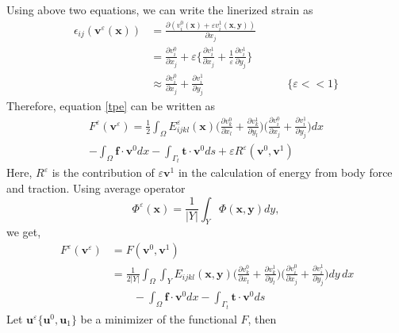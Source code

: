 \documentclass[openright,twoside]{iitkthesis}
\newcommand{\e}[1]{\textbf{#1}}
\begin{document}
Using above two equations, we can write the linerized strain as
\begin{equation}
\begin{split}
\epsilon_{ij}(\textbf{v}^\varepsilon(\textbf{x})) &= \frac{\partial (v_{i}^0(\textbf{x})+\varepsilon v_{i}^1(\textbf{x},\textbf{y}))}{\partial x_j}\\
&=\frac{\partial v_i^0}{\partial x_j}+\varepsilon\bigg\{\frac{\partial v_{i}^1}{\partial x_j}+\frac{1}{\varepsilon}\frac{\partial v_{i}^1}{\partial y_j}\bigg\}\\
&\approx \frac{\partial v_{i}^0}{\partial x_j}+\frac{\partial v_{i}^1}{\partial y_j} &\qquad \{ \varepsilon << 1\}
\end{split}
\end{equation}
Therefore, equation \eqref{tpe} can be written as 
\begin{multline}
F^\varepsilon(\textbf{v}^\varepsilon) = \frac{1}{2}\int_\Omega E^\varepsilon_{ijkl}(\e x)\bigg (\frac{\partial v_{k}^0}{\partial x_l}+\frac{\partial v_{k}^1}{\partial y_l}\bigg )\bigg (\frac{\partial v_{i}^0}{\partial x_j}+\frac{\partial v_{i}^1}{\partial y_j}\bigg )dx\\
-\int_\Omega\textbf{f}\cdot\textbf{v}^0 dx - \int_{\Gamma_t}\textbf{t}\cdot\textbf{v}^0 ds + \varepsilon R^\varepsilon(\textbf{v}^0, \textbf{v}^1)
\end{multline}
Here, $R^\varepsilon$ is the contribution of $\varepsilon\textbf{v}^1$ in the calculation of energy from body force and traction.
Using average operator 
\begin{equation}
\Phi^\varepsilon(\e x) = \frac{1}{|Y|}\int_Y \Phi(\e x,\e y)dy,
\end{equation}
we get,
\begin{equation}
\begin{split}
\,F^\varepsilon(\textbf{v}^\varepsilon)&=F(\textbf{v}^0,\textbf{v}^1)\\
&=\frac{1}{2|Y|}\int_\Omega\int_Y E_{ijkl}(\e x,\e y) \bigg (\frac{\partial v_{k}^0}{\partial x_l}+\frac{\partial v_{k}^1}{\partial y_l}\bigg )\bigg (\frac{\partial v_{i}^0}{\partial x_j}+\frac{\partial v_{i}^1}{\partial y_j}\bigg )dy\,dx\\
&\qquad-\int_\Omega\textbf{f}\cdot\textbf{v}^0 dx - \int_{\Gamma_t}\textbf{t}\cdot\textbf{v}^0 ds 
\end{split}
\end{equation}
Let $\e u^\varepsilon\{\textbf{u}^0, \textbf{u}_1\}$ be a minimizer of the functional $F$, then 
\end{document}
